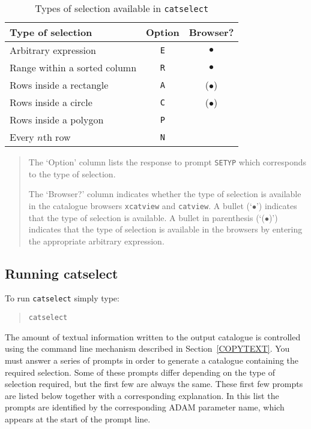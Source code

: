 \documentclass[twoside,11pt]{article}
\renewcommand{\_}{\texttt{\symbol{95}}}
\begin{document}
\begin{table}[htbp]

\begin{center}
\begin{tabular}{lcc}
Type of selection            & Option   & Browser?    \\ \hline
Arbitrary expression         & {\tt E}  & $\bullet$   \\
Range within a sorted column & {\tt R}  & $\bullet$   \\
Rows inside a rectangle      & {\tt A}  & ($\bullet$) \\
Rows inside a circle         & {\tt C}  & ($\bullet$) \\
Rows inside a polygon        & {\tt P}  & \\
Every $n$th row              & {\tt N}  & \\
\end{tabular}
\end{center}

\begin{quote}
The `Option' column lists the response to prompt {\tt SETYP} which
corresponds to the type of selection.

The `Browser?' column indicates whether the type of selection is
available in the catalogue browsers {\tt xcatview} and {\tt catview}.
A bullet (`$\bullet$') indicates that the type of selection is
available.  A bullet in parenthesis (`($\bullet$)') indicates that the
type of selection is available in the browsers by entering the
appropriate arbitrary expression.
\end{quote}

\caption{Types of selection available in {\tt catselect}
\label{SELTYPT} }

\end{table}

\subsection{Running catselect}

To run {\tt catselect} simply type:

\begin{verse}
{\tt catselect}
\end{verse}

The amount of textual information written to the output catalogue is
controlled using the command line mechanism described in
Section~\ref{COPYTEXT}.
You must answer a series of prompts in order to generate a catalogue
containing the required selection.  Some of these prompts differ
depending on the type of selection required, but the first few are
always the same.  These first few prompts are listed below together
with a corresponding explanation.  In this list the prompts are
identified by the corresponding ADAM parameter name, which appears at
the start of the prompt line.
\end{document}
